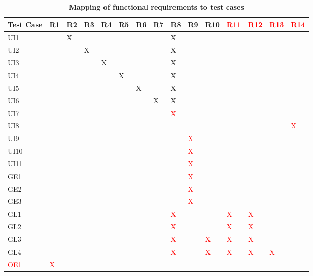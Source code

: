 \documentclass[12pt, titlepage]{article}
\begin{document}
\begin{table}[H]
\begin{adjustwidth}{-3.8cm}{}
\begin{tabular}{ |p{1cm}|p{0.8cm}|p{1cm}|p{1cm}|p{1cm}|p{1cm}|p{1cm}|p{1cm}|p{1cm}|p{1cm}|p{1cm}|p{1cm}|p{1cm}|p{1cm}|p{1cm}|  }
\hline
 \textbf{Test Case} & R1 & R2 & R3 & R4 & R5 & R6 & R7 & R8 & R9 & R10 & \textcolor{red}{R11} & \textcolor{red}{R12} &\textcolor{red}{R13} & \textcolor{red}{R14}\\
\hline\hline
UI1& & X & & & & & & X & & & & & &\\
\hline
UI2& & & X & & & & & X & & & & & &\\
\hline
UI3&&&&X&&&&X&&&&&&\\
\hline
UI4&&&&&X&&&X&&&&&&\\
\hline
UI5&&&&&&X&&X&&&&&&\\
\hline
UI6&&&&&&&X&X&&&&&&\\
\hline
UI7& & & & & & & & \textcolor{red}{X} & & & & & &\\
\hline
UI8& & & & & & & & & & & & & & \textcolor{red}{X}\\
\hline
UI9& & & & & & & & & \textcolor{red}{X} & & & & &\\
\hline
UI10& & & & & & & & & \textcolor{red}{X} & & & & &\\
\hline
UI11& & & & & & & & & \textcolor{red}{X} & & & & &\\
\hline
GE1& & & & & & & & & \textcolor{red}{X} & & & & &\\
\hline
GE2& & & & & & & & & \textcolor{red}{X} & & & & &\\
\hline
GE3& & & & & & & & & \textcolor{red}{X} & & & & &\\
\hline
GL1& & & & & & & & \textcolor{red}{X} & & & \textcolor{red}{X} & \textcolor{red}{X} & &\\
\hline
GL2& & & & & & & & \textcolor{red}{X} & & & \textcolor{red}{X} & \textcolor{red}{X} & &\\
\hline
GL3& & & & & & & & \textcolor{red}{X} & & \textcolor{red}{X} & \textcolor{red}{X} & \textcolor{red}{X} & &\\
\hline
GL4& & & & & & & & \textcolor{red}{X} & & \textcolor{red}{X} & \textcolor{red}{X} & \textcolor{red}{X} & \textcolor{red}{X} &\\
\hline
\textcolor{red}{OE1}&\textcolor{red}{X}&&&&&&&&&&&&&\\
\hline
\end{tabular}
\caption{\textbf{Mapping of functional requirements to test cases}}
\end{adjustwidth}
\end{table}
\end{document}

